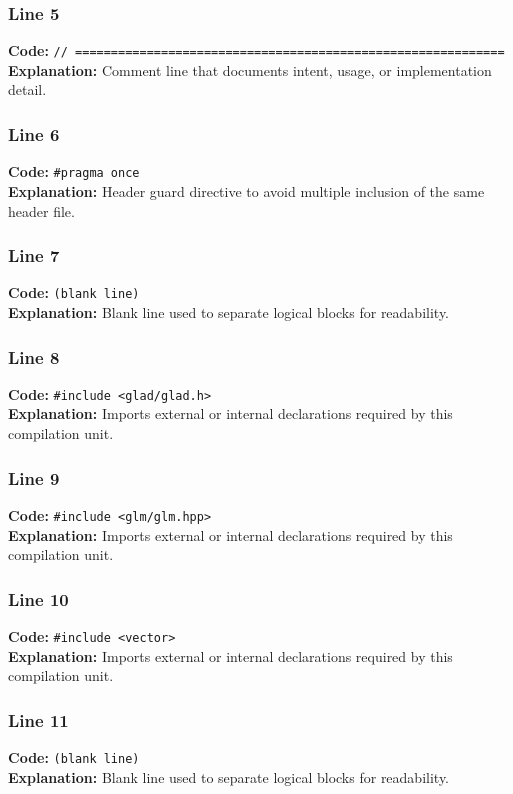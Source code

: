 \documentclass[11pt,a4paper]{article}
\begin{document}
\subsubsection*{Line 5}
\textbf{Code:} \verb|// ============================================================|\\
\textbf{Explanation:} Comment line that documents intent, usage, or implementation detail.

\subsubsection*{Line 6}
\textbf{Code:} \verb|#pragma once|\\
\textbf{Explanation:} Header guard directive to avoid multiple inclusion of the same header file.

\subsubsection*{Line 7}
\textbf{Code:} \texttt{(blank line)}\\
\textbf{Explanation:} Blank line used to separate logical blocks for readability.

\subsubsection*{Line 8}
\textbf{Code:} \verb|#include <glad/glad.h>|\\
\textbf{Explanation:} Imports external or internal declarations required by this compilation unit.

\subsubsection*{Line 9}
\textbf{Code:} \verb|#include <glm/glm.hpp>|\\
\textbf{Explanation:} Imports external or internal declarations required by this compilation unit.

\subsubsection*{Line 10}
\textbf{Code:} \verb|#include <vector>|\\
\textbf{Explanation:} Imports external or internal declarations required by this compilation unit.

\subsubsection*{Line 11}
\textbf{Code:} \texttt{(blank line)}\\
\textbf{Explanation:} Blank line used to separate logical blocks for readability.
\end{document}
